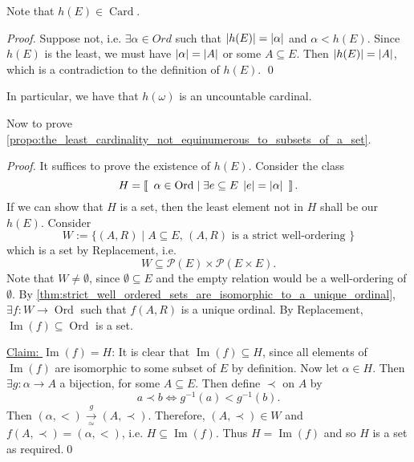 \documentclass[notoc,notitlepage]{tufte-book}
\newcommand{\class}[1]{\left\llbracket \enspace #1 \enspace \right\rrbracket}
\DeclareMathOperator{\Ord}{Ord }
\DeclareMathOperator{\Card}{Card }
\DeclareMathOperator{\Img}{Im }
\begin{document}
\begin{note}
  Note that $h(E) \in \Card$.

  \begin{proof}
    Suppose not, i.e. $\exists \alpha \in Ord$ such that $\left|h(E)\right| = \left|\alpha\right|$ and $\alpha < h(E)$. Since $h(E)$ is the least, we must have $\left|\alpha\right| = \left|A\right|$ or some $A \subseteq E$. Then $\left|h(E)\right| = \left|A\right|$, which is a contradiction to the definition of $h(E)$. \qed
  \end{proof}

  In particular, we have that $h(\omega)$ is an uncountable cardinal.
\end{note}

Now to prove \cref{propo:the_least_cardinality_not_equinumerous_to_subsets_of_a_set}.

\begin{proof}
  It suffices to prove the existence of $h(E)$. Consider the class
  \begin{equation*}
    H = \class{ \alpha \in \Ord \mid \exists e \subseteq E \; \abs{e} = \abs{\alpha} }.
  \end{equation*}
  If we can show that $H$ is a set, then the least element not in $H$ shall be our $h(E)$. Consider
  \begin{equation*}
    W := \{ (A, R) \mid A \subseteq E, \, (A, R) \text{ is a strict well-ordering } \}
  \end{equation*}
  which is a set by Replacement, i.e.
  \begin{equation*}
    W \subseteq \mathcal{P}(E) \times \mathcal{P}( E \times E ).
  \end{equation*}
  Note that $W \neq \emptyset$, since $\emptyset \subseteq E$ and the empty relation would be a well-ordering of $\emptyset$. By \cref{thm:strict_well_ordered_sets_are_isomorphic_to_a_unique_ordinal}, $\exists f : W \to \Ord$ such that $f(A, R)$ is a unique ordinal. By Replacement, $\Img(f) \subseteq \Ord$ is a set.

  \underline{Claim: $\Img(f) = H$}: It is clear that $\Img(f) \subseteq H$, since all elements of $\Img(f)$ are isomorphic to some subset of $E$ by definition. Now let $\alpha \in H$. Then $\exists g : \alpha \to A$ a bijection, for some $A \subseteq E$. Then define $\prec$ on $A$ by
  \begin{equation*}
    a \prec b \iff g^{-1}(a) < g^{-1}(b).
  \end{equation*}
  Then $(\alpha, <) \overset{g}{\underset{\simeq}{\to}} (A, \prec)$. Therefore, $(A, \prec) \in W$ and $f(A, \prec) = (\alpha, <)$, i.e. $H \subseteq \Img(f)$. Thus $H = \Img(f)$ and so $H$ is a set as required.\qed
\end{proof}
\end{document}
